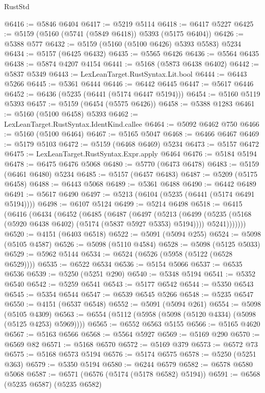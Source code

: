\begin{lexlean}{RustStd}
\begin{coremodule}
@6416 := @5846 @6404
@6417 := @5219 @5114
@6418 := @6417 @5227
@6425 := @5159 (@5160 (@5741 (@5849 @6418)) @5393 (@5175 @6404))
@6426 := @5388 @577
@6432 := @5159 (@5160 (@5100 @6426) @5393 @5583) @5234
@6434 := @5157 (@6425 @6432)
@6435 := @5565 @6426
@6436 := @5564 @6435
@6438 := @5874 @4207 @4154
@6441 := @5168 (@5873 @6438 @6402)
@6442 := @5837 @5349
@6443 := LexLeanTarget.RustSyntax.Lit.bool
@6444 := @6443 @5266
@6445 := @5361 @6444
@6446 := @6442 @6445
@6447 := @5617 @6446
@6452 := @6436 (@5235 (@6441 (@5174 @6447 @5194)))
@6454 := @5160 @5119 @5393
@6457 := @5159 (@6454 (@5575 @6426))
@6458 := @5388 @1283
@6461 := @5160 (@5100 @6458) @5393
@6462 := LexLeanTarget.RustSyntax.IdentKind.callee
@6464 := @5092 @6462 @750
@6466 := @5160 (@5100 @6464)
@6467 := @5165 @5047
@6468 := @6466 @6467
@6469 := @5179 @5103
@6472 := @5159 (@6468 @6469) @5234
@6473 := @5157 @6472
@6475 := LexLeanTarget.RustSyntax.Expr.apply @6464
@6476 := @5184 @5194
@6478 := @6475 @6476 @5068
@6480 := @5770 (@6473 @6478)
@6483 := @5159 (@6461 @6480) @5234
@6485 := @5157 (@6457 @6483)
@6487 := @5209 (@5175 @6458)
@6488 := @6443 @5068
@6489 := @5361 @6488
@6490 := @6442 @6489
@6491 := @5617 @6490
@6497 := @5213 (@6104 (@5235 (@6441 (@5174 @6491 @5194))))
@6498 := @6107 @5124
@6499 := @5214 @6498
@6518 := @6415
    (@6416
      (@6434
        (@6452
          (@6485
            (@6487
              (@6497
                (@5213
                  (@6499 (@5235 (@5168 (@5920 @6438 @6402) (@5174 (@5837 @5927 @5353) @5194))))
                  @5241)))))))
@6520 := @4151 (@6403 @6518)
@6522 := @5091 (@5094 @255)
@6524 := @5098 (@5105 @4587)
@6526 := @5098 (@5110 @4584)
@6528 := @5098 (@5125 @5033)
@6529 := @5962 @5144
@6534 := @6524 (@6526 (@5958 (@5122 (@6528 @6529))))
@6535 := @6522 @6534
@6536 := @5154 @5066
@6537 := @6535 @6536
@6539 := @5250 (@5251 @290)
@6540 := @5348 @5194
@6541 := @5352 @6540
@6542 := @5259 @6541
@6543 := @5177 @6542
@6544 := @5350 @6543
@6545 := @5354 @6544
@6547 := @6539 @6545 @5266
@6548 := @5235 @6547
@6550 := @4151 (@6537 @6548)
@6552 := @5091 (@5094 @261)
@6554 := @5098 (@5105 @4309)
@6563 := @6554 (@5112 (@5958 (@5098 (@5120 @4334) (@5098 (@5125 @4253) @5969))))
@6565 := @6552 @6563 @5155
@6566 := @5165 @4620
@6567 := @5163 @6566
@6568 := @5564 @5927
@6569 := @5169 @290
@6570 := @6569 @82
@6571 := @5168 @6570
@6572 := @5169 @379
@6573 := @6572 @73
@6575 := @5168 @6573 @5194
@6576 := @5174 @6575
@6578 := @5250 (@5251 @363)
@6579 := @5350 @5194
@6580 := @6244 @6579
@6582 := @6578 @6580 @5068
@6587 := @6571 (@6576 (@5174 (@5178 @6582) @5194))
@6591 := @6568 (@5235 @6587) (@5235 @6582)

\end{coremodule}
\end{lexlean}
